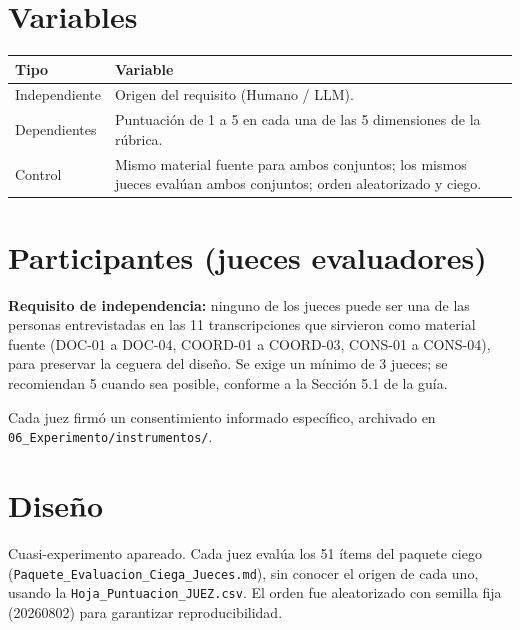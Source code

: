 \documentclass[11pt,a4paper]{article}
\begin{document}
\section{Variables}
\begin{longtable}{p{3.2cm}p{11cm}}
\toprule
\textbf{Tipo} & \textbf{Variable} \\
\midrule
\endhead
Independiente & Origen del requisito (Humano / LLM). \\
Dependientes & Puntuación de 1 a 5 en cada una de las 5 dimensiones de la rúbrica. \\
Control & Mismo material fuente para ambos conjuntos; los mismos jueces evalúan ambos conjuntos; orden aleatorizado y ciego. \\
\bottomrule
\end{longtable}

\section{Participantes (jueces evaluadores)}
\textbf{Requisito de independencia:} ninguno de los jueces puede ser una de las
personas entrevistadas en las 11 transcripciones que sirvieron como material fuente
(DOC-01 a DOC-04, COORD-01 a COORD-03, CONS-01 a CONS-04), para preservar la ceguera
del diseño. Se exige un mínimo de 3 jueces; se recomiendan 5 cuando sea posible,
conforme a la Sección 5.1 de la guía.

Cada juez firmó un consentimiento informado específico, archivado en
\texttt{06\_Experimento/instrumentos/}.

\section{Diseño}
Cuasi-experimento apareado. Cada juez evalúa los 51 ítems del paquete ciego
(\texttt{Paquete\_Evaluacion\_Ciega\_Jueces.md}), sin conocer el origen de cada uno,
usando la \texttt{Hoja\_Puntuacion\_JUEZ.csv}. El orden fue aleatorizado con semilla
fija (20260802) para garantizar reproducibilidad.
\end{document}

